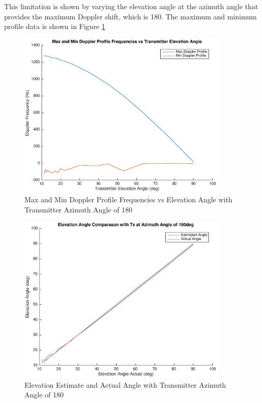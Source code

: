 This limitation is shown by varying the elevation angle at the azimuth angle that provides the maximum Doppler shift, which is 180\textdegree. The maximum and minimum profile data is shown in Figure \ref{fig:envelope_180deg}

\begin{figure}
	\begin{center}
		\includegraphics[width=10cm]{images/simulation/elevation_angle_max_doppler_180deg.eps}
		\caption{Max and Min Doppler Profile Frequencies vs Elevation Angle with Transmitter Azimuth Angle of 180\textdegree}
		\label{fig:envelope_180deg}
	\end{center}
\end{figure}

\begin{figure}
	\begin{center}
		\includegraphics[width=10cm]{images/results/Elevation_angle_comparason_180deg_Azimuth.eps}
		\caption{Elevation Estimate and Actual Angle with Transmitter Azimuth Angle of 180\textdegree}
		\label{fig:angle_comparason_180deg}
	\end{center}
\end{figure}

